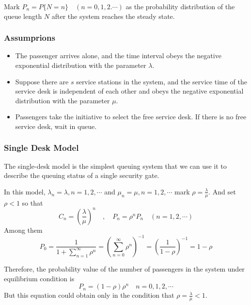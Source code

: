 \documentclass{mcmthesis}
\begin{document}
\par Mark $P_n = P\{N = n\} \quad (n = 0,1,2.\cdots)$ as the probability distribution of the queue length $N$ after the system reaches the steady state.

\subsubsection*{Assumprions} 
\begin{itemize}
	\item The passenger arrives alone, and the time interval obeys the negative exponential distribution with the parameter $\lambda$.
	\item Suppose there are $s$ service stations in the system, and the service time of the service desk is independent of each other and obeys the negative exponential distribution with the parameter $\mu$.
	\item Passengers take the initiative to select the free service desk. If there is no free service desk, wait in queue.
\end{itemize}

\subsubsection{Single Desk Model}
\par The single-desk model is the simplest queuing system that we can use it to describe the queuing status of a single security gate.
\par In this model, $\lambda_n = \lambda, n = 1, 2, \cdots$ and $\mu_n = \mu, n = 1, 2, \cdots$ mark $\rho = \frac{\lambda}{\mu}$. And set $\rho < 1$  so that 
$$C_n = \left( \frac{\lambda}{\mu} \right)^n \quad , \quad P_n = \rho^n P_n \quad (n = 1, 2, \cdots) $$
Among them
\begin{equation}
	P_0 = \frac{1}{1 + \sum \limits_{n=1}^\infty \rho^n} = \left( \sum \limits_{n=0}^\infty \rho^n \right)^{-1} = \left( \frac{1}{1 - \rho} \right)^{-1} = 1-\rho
\end{equation}
\par Therefore, the probability value of the number of passengers in the system under equilibrium condition is 
\begin{equation}
	P_n = (1-\rho)\rho^n \quad n = 0, 1, 2, \cdots
\end{equation}
But this equation could obtain only in the condition that $\rho = \frac{\lambda}{\mu} < 1$. 
\end{document}
